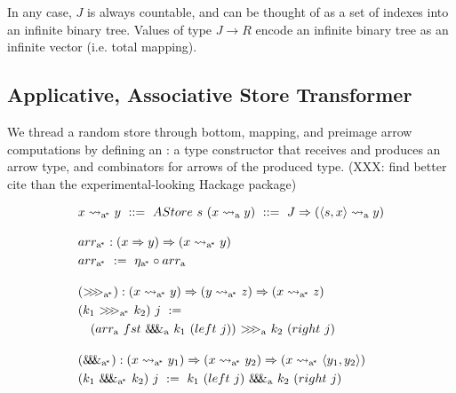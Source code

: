 \documentclass[preprint]{sigplanconf}
\newcommand{\arrow}{\rightsquigarrow}
\newcommand{\arrowarr}{\ensuremath{arr}}
\newcommand{\arrowcomp}{\ensuremath{{>}\mspace{-6mu}{>}\mspace{-6mu}{>}}}
\newcommand{\arrowpair}{\ensuremath{\mathit{\&\mspace{-7.5mu}\&\mspace{-7.5mu}\&}}}
\newcommand{\arrowtrans}{\ensuremath{\eta}}
\newcommand{\gen}{_\mathrm{a}}
\newcommand{\genc}{_\mathrm{a^{\mspace{-2mu}*}}}
\begin{document}
In any case, $J$ is always countable, and can be thought of as a set of indexes into an infinite binary tree.
Values of type $J \to R$ encode an infinite binary tree as an infinite vector (i.e. total mapping).

\subsection{Applicative, Associative Store Transformer}

We thread a random store through bottom, mapping, and preimage arrow computations by defining an : a type constructor that receives and produces an arrow type, and combinators for arrows of the produced type. (XXX: find better cite than the experimental-looking Hackage package)

\begin{figure*}[t]\centering
\begin{align*}
\begin{aligned}[t]
	&\begin{aligned}[t]
		x \arrow\genc y \ ::= \ AStore~s~(x \arrow\gen y) \ ::= \ J \tto (\pair{s,x} \arrow\gen y)
	\end{aligned} \\
\\[-6pt]
	&\begin{aligned}[t]
		&\arrowarr\genc : (x \tto y) \tto (x \arrow\genc y) \\
		&\arrowarr\genc \ := \ \arrowtrans\genc \circ \arrowarr\gen
	\end{aligned} \\
\\[-6pt]
	&\begin{aligned}[t]
		&(\arrowcomp\genc) : (x \arrow\genc y) \tto (y \arrow\genc z) \tto (x \arrow\genc z) \\
		&(k_1~\arrowcomp\genc~k_2)~j \ := \\
			&\tab(\arrowarr\gen~fst~\arrowpair\gen~k_1~(left~j))~\arrowcomp\gen~k_2~(right~j)
	\end{aligned} \\
\\[-6pt]
	&\begin{aligned}[t]
		&(\arrowpair\genc) : (x \arrow\genc y_1) \tto (x \arrow\genc y_2) \tto (x \arrow\genc \pair{y_1,y_2}) \\
		&(k_1~\arrowpair\genc~k_2)~j \ := \ k_1~(left~j)~\arrowpair\gen~k_2~(right~j)
	\end{aligned} \\
\end{aligned}

\end{align*}
\end{figure*}
\end{document}
